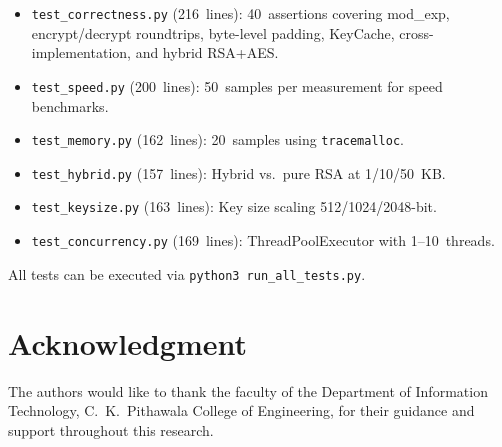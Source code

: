 \documentclass[journal]{IEEEtran}
\begin{document}
\begin{itemize}
    \item \texttt{test\_correctness.py} (216~lines): 40~assertions covering mod\_exp, encrypt/decrypt roundtrips, byte-level padding, KeyCache, cross-implementation, and hybrid RSA+AES.
    \item \texttt{test\_speed.py} (200~lines): 50~samples per measurement for speed benchmarks.
    \item \texttt{test\_memory.py} (162~lines): 20~samples using \texttt{tracemalloc}.
    \item \texttt{test\_hybrid.py} (157~lines): Hybrid vs.\ pure RSA at 1/10/50~KB.
    \item \texttt{test\_keysize.py} (163~lines): Key size scaling 512/1024/2048-bit.
    \item \texttt{test\_concurrency.py} (169~lines): ThreadPoolExecutor with 1--10~threads.
\end{itemize}

All tests can be executed via \texttt{python3 run\_all\_tests.py}.


\section*{Acknowledgment}

The authors would like to thank the faculty of the Department of Information Technology, C.~K.~Pithawala College of Engineering, for their guidance and support throughout this research.


\ifCLASSOPTIONcaptionsoff
\newpage
\fi
\end{document}
